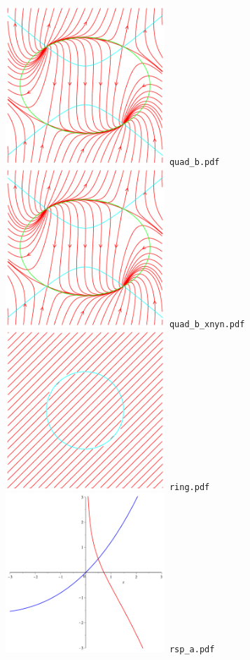 \documentclass[a4paper]{amsart}
\begin{document}
\includegraphics[width=6cm]{quad_b.pdf}\verb+ quad_b.pdf+\\
\includegraphics[width=6cm]{quad_b_xnyn.pdf}\verb+ quad_b_xnyn.pdf+\\
\includegraphics[width=6cm]{ring.pdf}\verb+ ring.pdf+\\
\includegraphics[width=6cm]{rsp_a.pdf}\verb+ rsp_a.pdf+\\
\end{document}
